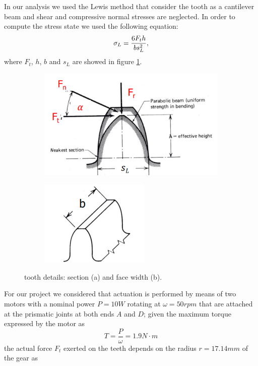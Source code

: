 In our analysis we used the Lewis method that consider the tooth as a cantilever beam and shear and compressive normal stresses are neglected.
In order to compute the stress state we used the following equation:
\begin{equation}
	\centering
	\sigma_L=\frac{6F_th}{bs_L^2},
	\label{stress}
\end{equation}
where $F_t$, $h$, $b$ and $s_L$ are showed in figure \ref{fig:tooth}.
\begin{figure}[bt]
\begin{subfigure}{.5\textwidth}
	\centering
	\includegraphics[scale=0.5]{Images/toothgear1.png}
	\caption{}
\end{subfigure}%
\begin{subfigure}{.5\textwidth}
	\centering
	\includegraphics[scale=0.6]{Images/toothgear2.png}
	\caption{}
\end{subfigure}
\caption{tooth details: section (a) and face width (b).}
\label{fig:tooth}
\end{figure}
For our project we considered that actuation is performed by means of two motors with a nominal power $P=10W$ rotating at $\omega=50rpm$ that are attached at the prismatic joints at both ends $A$ and $D$; given the maximum torque expressed by the motor as
\begin{equation*}
	T = \frac{P}{\omega} = 1.9 N\cdot m 
\end{equation*}
the actual force $F_t$ exerted on the teeth depends on the radius $r = 17.14mm$ of the gear as
